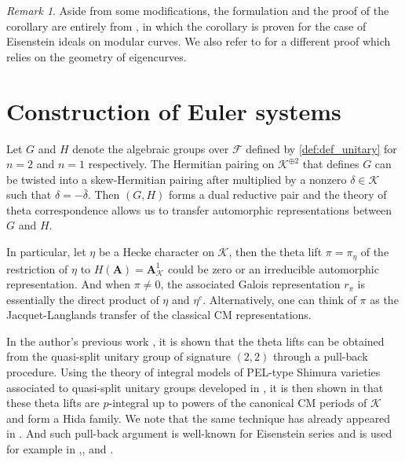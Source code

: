 \documentclass[leqno]{amsart}
\theoremstyle{definition}
\theoremstyle{remark}
\newtheorem{rem}[thm]{Remark}
\newcommand{\A}{\mathbf A}
\newcommand{\F}{{\mathcal{F}}} %
\newcommand{\K}{{\mathcal{K}}} %
\begin{document}
\begin{rem}
Aside from some modifications,
the formulation and the proof of the corollary
are entirely from \cite[Prop. 6.3.5]{urban},
in which the corollary is proven 
for the case of Eisenstein ideals on modular curves.
We also refer to \cite[Thm 3.4.1]{urban}
for a different proof 
which relies on the geometry of eigencurves.
\end{rem}


\section{Construction of Euler systems}

Let $G$ and $H$ denote the algebraic groups over $\F$
defined by \eqref{def:def_unitary}
for $n=2$ and $n=1$ respectively.
The Hermitian pairing on $\K^{\oplus 2}$
that defines $G$ can be twisted into 
a skew-Hermitian pairing after multiplied by 
a nonzero $\delta\in \K$ such that $\delta=-\bar{\delta}$.
Then $(G, H)$ forms a dual reductive pair
and the theory of theta correspondence 
allows us to transfer automorphic representations
between $G$ and $H$.

In particular, 
let $\eta$ be a Hecke character on $\K$,
then the theta lift $\pi=\pi_\eta$ of the restriction of $\eta$
to $H(\A)=\A_{\K}^1$ could be zero or an irreducible 
automorphic representation. 
And when $\pi\neq 0$, the associated Galois representation
$r_\pi$ is essentially the direct product of $\eta$ and $\eta^c$.
Alternatively, one can think of $\pi$ as the Jacquet-Langlands
transfer of the classical CM representations.

In the author's previous work \cite{lee},
it is shown that the theta lifts
can be obtained from the quasi-split unitary group
of signature $(2,2)$ through a pull-back procedure.
Using the theory of integral models
of PEL-type Shimura varieties
associated to quasi-split unitary groups
developed in \cite{Hida04},
it is then shown in \cite{lee}
that these theta lifts 
are $p$-integral up to powers of the canonical
CM periods of $\K$
and form a Hida family.
We note that the same technique has already appeared in \cite{wan}.
And such pull-back argument is well-known 
for Eisenstein series and is used for example in 
\cite{SU},\cite{EHLS}, and \cite{Hsieh2014}.
\end{document}
